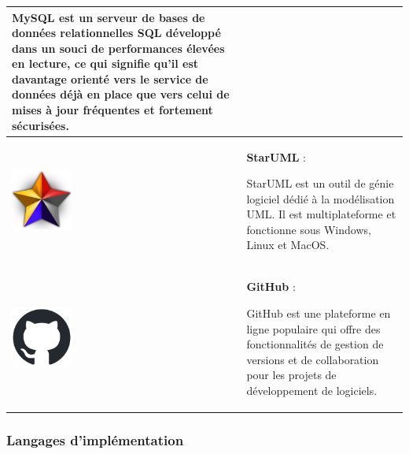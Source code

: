 \documentclass{article}
\begin{document}
\begin{tabular}{|m{2cm}|m{12cm}|}
                MySQL est un serveur de bases de données relationnelles SQL développé dans un souci de performances élevées en lecture, ce qui signifie qu'il est davantage orienté vers le service de données déjà en place que vers celui de mises à jour fréquentes et fortement sécurisées. \\
                \hline
                \includegraphics[width=2cm]{assets/logos/staruml-icon.png} &
                \textbf{StarUML} :
                
                StarUML est un outil de génie logiciel dédié à la modélisation UML. Il est multiplateforme et fonctionne sous Windows, Linux et MacOS. \\
                \hline
                \includegraphics[width=2cm]{assets/logos/github-mark.png} &
                \textbf{GitHub} :
                
                GitHub est une plateforme en ligne populaire qui offre des fonctionnalités de gestion de versions et de collaboration pour les projets de développement de logiciels. \\
                \hline
            \end{tabular}
            
            \subsubsection{Langages d'implémentation}
            
\end{document}
